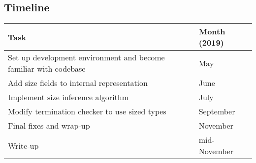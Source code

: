 \documentclass{article}
\begin{document}
\subsection{Timeline}
\begin{tabular}{|l|l|}
    \hline
    \textbf{Task} & \textbf{Month (2019)} \\
    \hline
    Set up development environment and become familiar with codebase & May\\
    Add size fields to internal representation & June \\
    Implement size inference algorithm & July \\
    Modify termination checker to use sized types & September \\
    Final fixes and wrap-up & November \\
    Write-up & mid-November \\
    \hline
\end{tabular}

\begin{comment}
\section{Extensions Beyond Scope}
\begin{itemize}
    \item Implementing translation of existing Coq code to a form that will work with sized types termination checking (since not all code would be able to be typed).
    \item Ensuring productivity of coinductive data and corecursive functions using sized types \cite{coinductive}.
    \item Enhancing successor-only sized types with addition using sized products \cite{sizedproducts}. See also \cite{chin}.
\end{itemize}
\end{comment}



\end{document}
